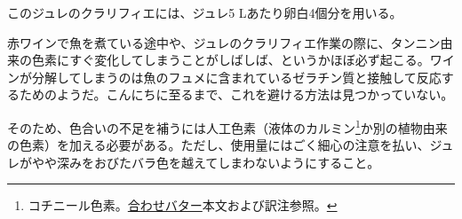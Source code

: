 \begin{recette}
このジュレのクラリフィエには、ジュレ5 Lあたり卵白4個分を用いる。

赤ワインで魚を煮ている途中や、ジュレのクラリフィエ作業の際に、タンニン由来の色素にすぐ変化してしまうことがしばしば、というかほぼ必ず起こる。ワインが分解してしまうのは魚のフュメに含まれているゼラチン質と接触して反応するためのようだ。こんにちに至るまで、これを避ける方法は見つかっていない。

そのため、色合いの不足を補うには人工色素（液体のカルミン\footnote{コチニール色素。\protect\hyperlink{beurres-composes}{合わせバター}本文および訳注参照。}か別の植物由来の色素）を加える必要がある。ただし、使用量にはごく細心の注意を払い、ジュレがやや深みをおびたバラ色を越えてしまわないようにすること。

\end{recette}
